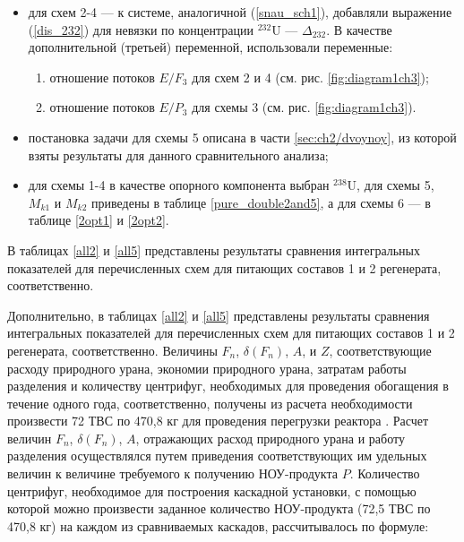 \begin{itemize}
    \item для схем 2-4 --- к системе, аналогичной (\ref{snau_sch1}), добавляли выражение (\ref{dis_232}) для невязки по концентрации $^{232}$U --- $\Delta_{232}$. В качестве дополнительной (третьей) переменной, использовали переменные:
    \begin{enumerate}
        \item отношение потоков $E/{F_3}$ для схем 2 и 4 (см. рис. \ref{fig:diagram1ch3});
        \item отношение потоков $E/{P_3}$ для схемы 3 (см. рис. \ref{fig:diagram1ch3}).
    \end{enumerate}
    \item постановка задачи для схемы 5 описана в части \ref{sec:ch2/dvoynoy}, из которой взяты результаты для данного сравнительного анализа;
    \item для схемы 1-4 в качестве опорного компонента выбран $^{238}$U, для схемы 5, $M_{k1}$ и $M_{k2}$ приведены в таблице \ref{pure_double2and5}, а для схемы 6 --- в таблице \ref{2opt1} и \ref{2opt2}.
\end{itemize}

В таблицах \ref{all2} и \ref{all5} представлены результаты сравнения интегральных показателей для перечисленных схем для питающих составов 1 и 2 регенерата, соответственно.

Дополнительно, в таблицах \ref{all2} и \ref{all5} представлены результаты сравнения интегральных показателей для перечисленных схем для питающих составов 1 и 2 регенерата, соответственно.
Величины $F_n$, $\delta(F_n)$, $A$, и $Z$, соответствующие расходу природного урана, экономии природного урана, затратам работы разделения и количеству центрифуг, необходимых для проведения обогащения в течение одного года, соответственно, получены из расчета необходимости произвести 72 ТВС по 470,8 кг для проведения перегрузки реактора \cite{BOBROVPovyshenieTehnikoekonomicheskihHarakteristik2019}. Расчет величин $F_n$, $\delta(F_n)$, $A$, отражающих расход природного урана и работу разделения осуществлялся путем приведения соответствующих им удельных величин к величине требуемого к получению НОУ-продукта $P$. Количество центрифуг, необходимое для построения каскадной установки, с помощью которой можно произвести заданное количество НОУ-продукта (72,5 ТВС по 470,8 кг) на каждом из сравниваемых каскадов, рассчитывалось по формуле:

